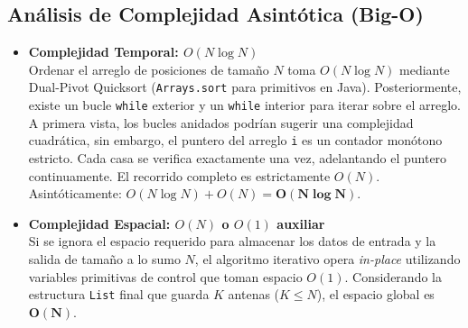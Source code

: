 \documentclass[11pt, a4paper]{article}
\begin{document}
\subsection{Análisis de Complejidad Asintótica (Big-O)}
\begin{itemize}
    \item \textbf{Complejidad Temporal: $O(N \log N)$} \\
    Ordenar el arreglo de posiciones de tamaño $N$ toma $O(N \log N)$ mediante Dual-Pivot Quicksort (\texttt{Arrays.sort} para primitivos en Java). Posteriormente, existe un bucle \texttt{while} exterior y un \texttt{while} interior para iterar sobre el arreglo. A primera vista, los bucles anidados podrían sugerir una complejidad cuadrática, sin embargo, el puntero del arreglo \texttt{i} es un contador monótono estricto. Cada casa se verifica exactamente una vez, adelantando el puntero continuamente. El recorrido completo es estrictamente $O(N)$. Asintóticamente: $O(N \log N) + O(N) = \mathbf{O(N \log N)}$.
    
    \item \textbf{Complejidad Espacial: $O(N)$ o $O(1)$ auxiliar} \\
    Si se ignora el espacio requerido para almacenar los datos de entrada y la salida de tamaño a lo sumo $N$, el algoritmo iterativo opera \textit{in-place} utilizando variables primitivas de control que toman espacio $O(1)$. Considerando la estructura \texttt{List} final que guarda $K$ antenas ($K \le N$), el espacio global es $\mathbf{O(N)}$.
\end{itemize}
\end{document}
